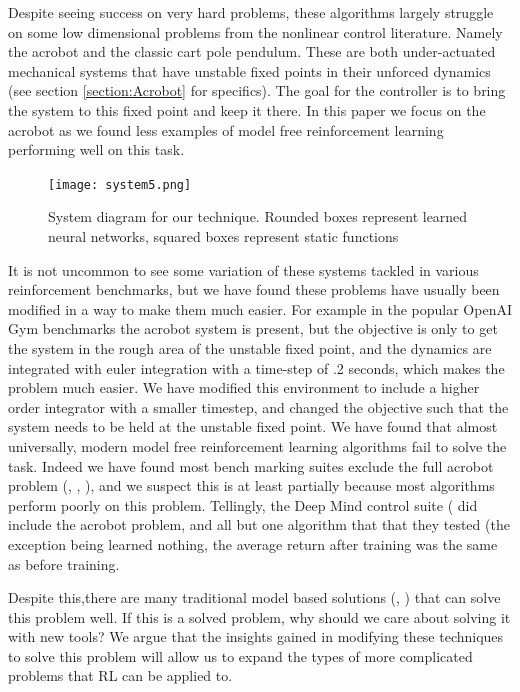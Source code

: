 \documentclass[letterpaper, 10 pt, conference]{ieeeconf}
\begin{document}
Despite seeing success on very hard problems, these algorithms largely struggle on some low dimensional problems from the nonlinear control literature. Namely the acrobot \cite{spong_swing_1994} and the classic cart pole pendulum. These are both under-actuated mechanical systems that have unstable fixed points in their unforced dynamics (see section \ref{section:Acrobot} for specifics). The goal for the controller is to bring the system to this fixed point and keep it there. In this paper we focus on the acrobot as we found less examples of model free reinforcement learning performing well on this task.

\begin{figure}[ht]
\centering
  \texttt{[image: system5.png]}
  \caption{System diagram for our technique. Rounded boxes represent learned neural networks, squared boxes represent static functions }
  \label{fig:hyst}
\end{figure}


It is not uncommon to see some variation of these systems tackled in various reinforcement benchmarks, but we have found these problems have usually been modified in a way to make them much easier. For example in the popular OpenAI Gym benchmarks \cite{1606.01540} the acrobot system is present, but the objective is only to get the system in the rough area of the unstable fixed point, and the dynamics are integrated with euler integration with a time-step of .2 seconds, which makes the problem much easier. We have modified this environment to include a higher order integrator with a smaller timestep, and changed the objective such that the system needs to be held at the unstable fixed point. We have found that almost universally, modern model free reinforcement learning algorithms fail to solve the task. Indeed we have found most bench marking suites exclude the full acrobot problem (\cite{garage}, \cite{coumans2019}, \cite{1606.01540}), and we suspect this is at least partially because most algorithms perform poorly on this problem. Tellingly, the Deep Mind control suite (\cite{deepmindcontrolsuite2018} did include the acrobot problem, and all but one algorithm that that they tested (the exception being \cite{barth-maron_distributed_2018} learned nothing, the average return after training was the same as before training. 

Despite this,there are many traditional model based solutions (\cite{spong_swing_1994}, \cite{spong_energy_1996}) that can solve this problem well. If this is a solved problem, why should we care about solving it with new tools? We argue that the insights gained in modifying these techniques to solve this problem will allow us to expand the types of more complicated problems that RL can be applied to.
\end{document}
